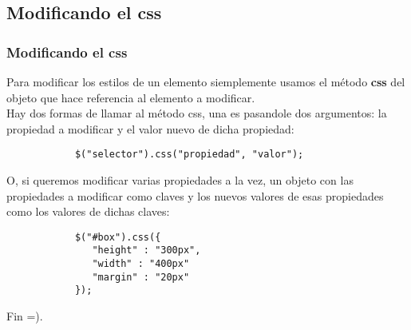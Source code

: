 \documentclass[10pt]{beamer}
\begin{document}
\subsection{Modificando el css}
\begin{frame}[fragile]
	\frametitle{Modificando el css}
	
	\pause Para modificar los estilos de un elemento siemplemente usamos el método \textbf{css} del objeto que
		hace referencia al elemento a modificar. \\
		
	\pause Hay dos formas de llamar al método css, una es pasandole dos argumentos: la propiedad a modificar
		y el valor nuevo de dicha propiedad:
	\pause \begin{lstlisting}
			$("selector").css("propiedad", "valor");
		\end{lstlisting}
		
	\pause O, si queremos modificar varias propiedades a la vez, un objeto con las propiedades a modificar como
		claves y los nuevos valores de esas propiedades como los valores de dichas claves:
	\pause \begin{lstlisting}
			$("#box").css({
			   "height" : "300px",
			   "width" : "400px"
			   "margin" : "20px"
			});
		\end{lstlisting}
\end{frame}

\begin{frame}
	\begin{center}
		Fin =).
	\end{center}
\end{frame}
\end{document}
